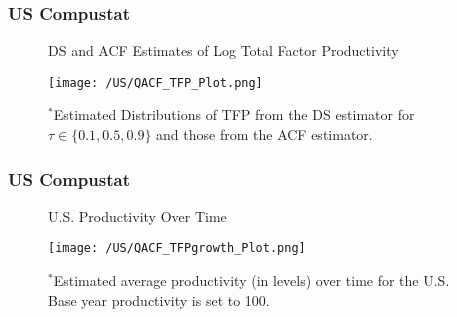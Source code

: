 \documentclass[xcolor={dvipsnames}, notheorems]{beamer}
\theoremstyle{plain}
\begin{document}

\begin{frame}
\frametitle{US Compustat}
\begin{figure}[H]
\centering
\caption{DS and ACF Estimates of Log Total Factor Productivity}
\texttt{[image: /US/QACF\_TFP\_Plot.png]}
\caption*{\footnotesize $^{*}$Estimated Distributions of TFP from the DS estimator for $\tau \in \{0.1, 0.5, 0.9\}$ and those from  the ACF estimator.}
\label{fig:QACFUSTFP}
\end{figure}
\end{frame}


\begin{frame}
\frametitle{US Compustat}
\begin{figure}[H]
\centering
\caption{U.S. Productivity Over Time}
\texttt{[image: /US/QACF\_TFPgrowth\_Plot.png]}
\caption*{\footnotesize $^{*}$Estimated average productivity (in levels) over time for the U.S. Base year productivity is set to 100.}
\label{fig:QACFUSTFPG}
\end{figure}
\end{frame}

\end{document}
